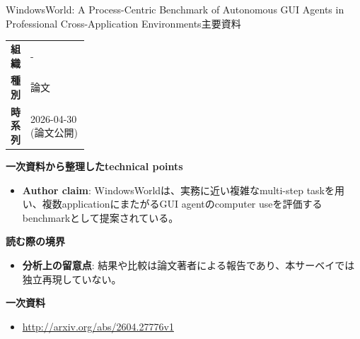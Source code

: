 \begin{technicalnote}{WindowsWorld: A Process-Centric Benchmark of Autonomous GUI Agents in Professional Cross-Application Environments}{主要資料}
\begingroup
\begin{tabularx}{\linewidth}{@{}>{\bfseries}p{0.22\linewidth}X@{}}
組織 & - \\
種別 & 論文 \\
時系列 & 2026-04-30 (論文公開) \\
\end{tabularx}
\smallskip
{\bfseries 一次資料から整理したtechnical points}
\begin{itemize}[leftmargin=1.5em,itemsep=0.35em]
\item \textbf{Author claim}: WindowsWorldは、実務に近い複雑なmulti-step taskを用い、複数applicationにまたがるGUI agentのcomputer useを評価するbenchmarkとして提案されている。
\end{itemize}
\begin{minipage}{\linewidth}
{\bfseries 読む際の境界}
\begin{itemize}[leftmargin=1.5em,itemsep=0.35em]
\item \textbf{分析上の留意点}: 結果や比較は論文著者による報告であり、本サーベイでは独立再現していない。
\end{itemize}
\begin{samepage}
{\bfseries 一次資料}
\begingroup\sloppy
\begin{itemize}[leftmargin=1.5em,itemsep=0.25em]
\item {\scriptsize\url{http://arxiv.org/abs/2604.27776v1}}
\end{itemize}
\endgroup
\end{samepage}
\end{minipage}
\endgroup
\end{technicalnote}
\medskip


